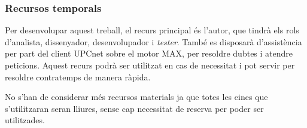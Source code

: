 \subsubsection{Recursos temporals}

Per desenvolupar aquest treball, el recurs principal és l'autor, que tindrà els rols d'analista, dissenyador, desenvolupador i \textit{tester}. També es disposarà d'assistència per part del client UPCnet sobre el motor MAX, per resoldre dubtes i atendre peticions. Aquest recurs podrà ser utilitzat en cas de necessitat i pot servir per resoldre contratemps de manera ràpida.

No s'han de considerar més recursos materials ja que totes les eines que s'utilitzaran seran lliures, sense cap necessitat de reserva per poder ser utilitzades. 